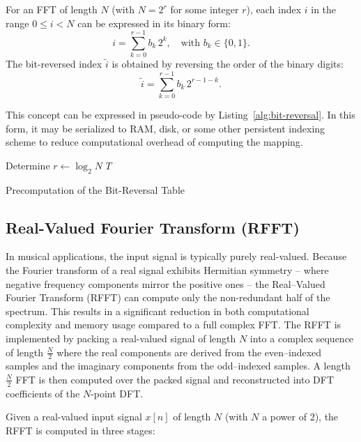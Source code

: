 \documentclass[12pt,letter]{article}
\begin{document}
For an FFT of length \( N \) (with \( N = 2^r \) for some integer \( r \)),
each index \( i \) in the range \( 0 \leq i < N \) can be expressed in its
binary form:
$$
i = \sum_{k=0}^{r-1} b_k \, 2^k, \quad \text{with } b_k \in \{0,1\}.
$$
The bit-reversed index \( \tilde{i} \) is obtained by reversing the order of
the binary digits:
$$
\tilde{i} = \sum_{k=0}^{r-1} b_k \, 2^{r-1-k}.
$$

This concept can be expressed in pseudo-code by Listing~\ref{alg:bit-reversal}.
In this form, it may be serialized to RAM, disk, or some other persistent
indexing scheme to reduce computational overhead of computing the mapping.

\begin{algorithm}[H]
\SetAlgoLined
{}
Determine \( r \gets \log_2 N \)\;
\Return \( T \)\;
\caption{Precomputation of the Bit-Reversal Table}
\label{alg:bit-reversal}
\end{algorithm}

\subsection{Real-Valued Fourier Transform (RFFT)}

In musical applications, the input signal is typically purely real-valued.
Because the Fourier transform of a real signal exhibits Hermitian
symmetry -- where negative frequency components mirror the positive ones --
the Real--Valued Fourier Transform (RFFT) can compute only the non-redundant
half of the spectrum. This results in a significant reduction in both
computational complexity and memory usage compared to a full complex FFT. The
RFFT is implemented by packing a real-valued signal of length $N$ into a
complex sequence of length $\frac{N}{2}$ where the real components are
derived from the even--indexed samples and the imaginary components from the
odd--indexed samples. A length $\frac{N}{2}$ FFT is then computed over the
packed signal and reconstructed into DFT coefficients of the $N$-point DFT.

Given a real-valued input signal \( x[n] \) of length \( N \) (with \( N \) a power of 2), the RFFT is computed in three stages:
\end{document}

